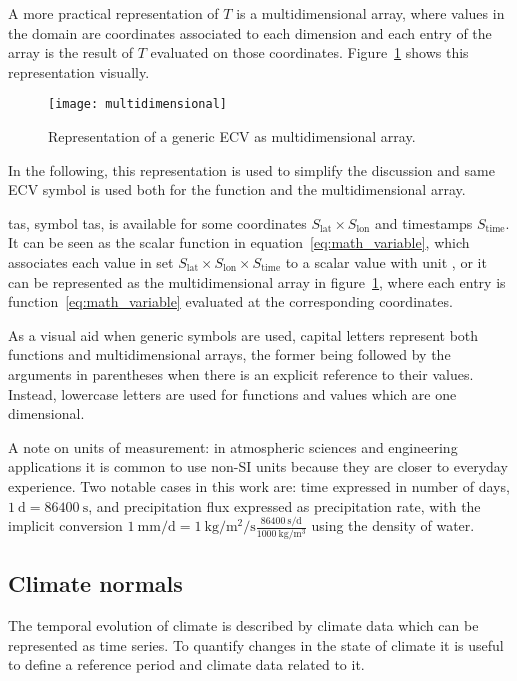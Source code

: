 A more practical representation of $T$ is a multidimensional array, where values in the domain are coordinates associated to each dimension and each entry of the array is the result of $T$ evaluated on those coordinates. Figure~\ref{fig:multidimensional} shows this representation visually.
\begin{figure}[h]
  \centering
  \texttt{[image: multidimensional]}
  \caption{Representation of a generic \gls{ECV} as multidimensional array.}
  \label{fig:multidimensional}
\end{figure}
In the following, this representation is used to simplify the discussion and same \gls{ECV} symbol is used both for the function and the multidimensional array.
\begin{example}
  \Glsdesc{tas}, symbol \gls{tas}, is available for some coordinates $S_\text{lat} \times S_\text{lon}$ and timestamps $S_\text{time}$. It can be seen as the scalar function in equation~\eqref{eq:math_variable}, which associates each value in set $S_\text{lat} \times S_\text{lon} \times S_\text{time}$ to a scalar value with unit , or it can be represented as the multidimensional array in figure~\ref{fig:multidimensional}, where each entry is function~\eqref{eq:math_variable} evaluated at the corresponding coordinates.
\end{example}

As a visual aid when generic symbols are used, capital letters represent both functions and multidimensional arrays, the former being followed by the arguments in parentheses when there is an explicit reference to their values. Instead, lowercase letters are used for functions and values which are one dimensional.

A note on units of measurement: in atmospheric sciences and engineering applications it is common to use non-SI units because they are closer to everyday experience. Two notable cases in this work are: time expressed in number of days, $\qty{1}{\day} = \qty{86400}{\second}$, and precipitation flux expressed as precipitation rate, with the implicit conversion $\qty{1}{\milli\metre\per\day} = \qty{1}{\kilo\gram\per\square\metre\per\second} \frac{\qty{86400}{\second\per\day}}{\qty{1000}{\kilo\gram\per\cubic\metre}}$ using the density of water.



\subsection{Climate normals}
\label{sec:Climate normals}
The temporal evolution of climate is described by climate data which can be represented as time series. To quantify changes in the state of climate it is useful to define a reference period and climate data related to it.

